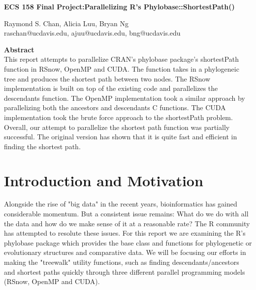 \documentclass[11pt,letterpaper]{article}
\begin{document}
\begin{center}
{\huge \textbf{ECS 158 Final Project:Parallelizing R's Phylobase::ShortestPath()}\\
\vspace{5mm}
\begin{Large}
Raymond S. Chan, Alicia Luu, Bryan Ng\\
raschan@ucdavis.edu, ajuu@ucdavis.edu, bng@ucdavis.edu\\
\end{Large}}
\end{center}


\vspace{5mm}

\begin{center}
	\begin{large}
		\textbf{Abstract}\\
This report attempts to parallelize CRAN's phylobase package's shortestPath function in RSnow, OpenMP and CUDA. The function takes in a phylogeneic tree and produces the shortest path between two nodes. The RSnow implementation is built on top of the existing code and parallelizes the descendants function. The OpenMP implementation took a similar approach by parallelizing both the ancestors and descendants C functions. The CUDA implementation took the brute force approach to the shortestPath problem. Overall, our attempt to parallelize the shortest path function was partially successful. The original version has shown that it is quite fast and efficient in finding the shortest path. \\
	\end{large}
\end{center}

\section{Introduction and Motivation}
 
Alongside the rise of "big data" in the recent years, bioinformatics has gained considerable momentum. But a consistent issue remains: What do we do with all the data and how do we make sense of it at a reasonable rate? The R community has attempted to resolute these issues. For this report we are examining the R's phylobase package which provides the base class and functions for phylogenetic or evolutionary structures and comparative data. We will be focusing our efforts in making the "treewalk" utility functions, such as finding descendants/ancestors and shortest paths quickly through three different parallel programming models (RSnow, OpenMP and CUDA).  
\end{document}
